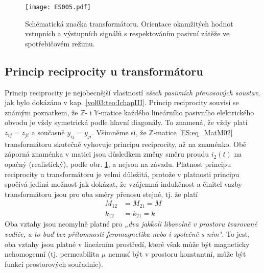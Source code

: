       \begin{figure}[ht!] %
        \centering
        \texttt{[image: ES005.pdf]}
        \caption{Schématická značka transformátoru. Orientace okamžitých hodnot vstupních a  
                 výstupních signálů s respektováním pasivní zátěže ve spotřebičovém režimu.}
        \label{ES:fig_005}
      \end{figure}

    \subsection{Princip reciprocity u transformátoru}
      Princip reciprocity je nejobecnější vlastností \emph{všech pasivních přenosových soustav}, 
      jak bylo dokázáno v kap. \ref{vol03:teo:IchapIII}. Princip reciprocity souvisí se známým 
      poznatkem, že \(\mathbb{Z}\)- i \(\mathbb{Y}\)-matice každého lineárního pasivního 
      elektrického obvodu je vždy symetrická podle hlavní diagonály. To znamená, že vždy platí 
      \(z_{ij} = z_{ji}\) a současně \(y_{ij} = y_{ji}\). Všimněme si, že \(\mathbb{Z}\)-matice 
      \ref{ES:eq_MatM02} transformátoru skutečně vyhovuje principu reciprocity, až na znaménko. Obě 
      záporná znaménka v matici jsou důsledkem změny směru proudu \(i_2(t)\) na opačný 
      (realistický), podle obr. \ref{ES:fig_005}, a nejsou na závadu. Platnost principu reciprocity 
      u transformátoru je velmi důležitá, protože v platnosti principu spočívá jediná možnost jak 
      dokázat, že vzájemná indukčnost a činitel vazby transformátoru jsou pro oba směry 
      přenosu stejné, tj. že platí
      \begin{subequations}
        \begin{align}
          M_{12} &= M_{21} = M  \label{teo:eq000a}\\
          k_{12} &= k_{21} = k  \label{teo:eq000b}
        \end{align}
      \end{subequations}
      Oba vztahy jsou neomylně platné pro \emph{„dva jakkoli libovolně v prostoru tvarované vodiče, 
      a to buď bez přítomnosti feromagnetika nebo i společně s ním".} To jest, oba vztahy jsou 
      platné v lineárním prostředí, které však může být magneticky nehomogenní (tj. permeabilita 
      \(\mu\) nemusí být v prostoru konstantní, může být funkcí prostorových souřadnic).
    

